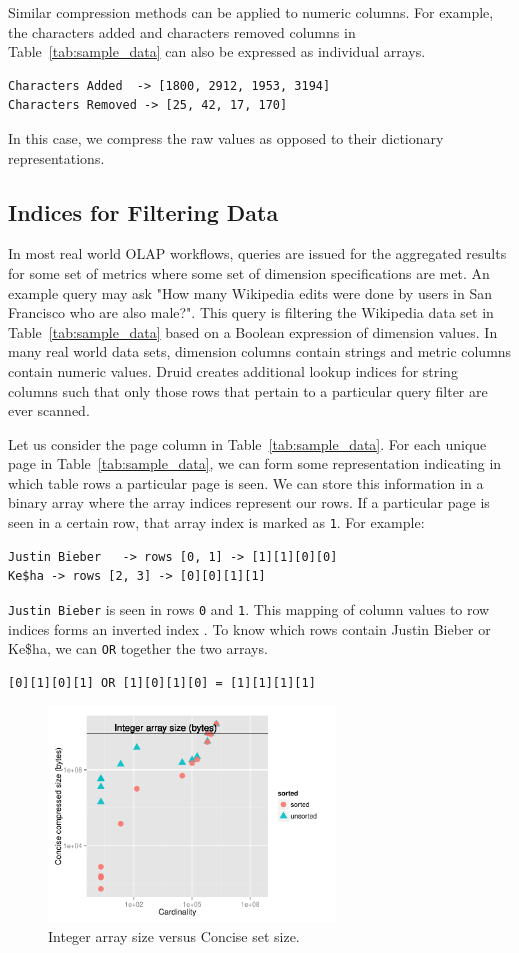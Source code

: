 \documentclass{acm_proc_article-sp}
\begin{document}
Similar compression methods can be applied to numeric
columns. For example, the characters added and characters removed columns in
Table~\ref{tab:sample_data} can also be expressed as individual
arrays.
\begin{verbatim}
Characters Added  -> [1800, 2912, 1953, 3194]
Characters Removed -> [25, 42, 17, 170]
\end{verbatim}
In this case, we compress the raw values as opposed to their dictionary
representations.

\subsection{Indices for Filtering Data}
In most real world OLAP workflows, queries are issued for the aggregated
results for some set of metrics where some set of dimension specifications are
met. An example query may ask "How many Wikipedia edits were done by users in
San Francisco who are also male?". This query is filtering the Wikipedia data
set in Table~\ref{tab:sample_data} based on a Boolean expression of dimension
values. In many real world data sets, dimension columns contain strings and
metric columns contain numeric values. Druid creates additional lookup
indices for string columns such that only those rows that pertain to a
particular query filter are ever scanned.

Let us consider the page column in
Table~\ref{tab:sample_data}. For each unique page in
Table~\ref{tab:sample_data}, we can form some representation
indicating in which table rows a particular page is seen. We can
store this information in a binary array where the array indices
represent our rows. If a particular page is seen in a certain
row, that array index is marked as \texttt{1}. For example:
\begin{verbatim}
Justin Bieber   -> rows [0, 1] -> [1][1][0][0]
Ke$ha -> rows [2, 3] -> [0][0][1][1]
\end{verbatim}

\texttt{Justin Bieber} is seen in rows \texttt{0} and \texttt{1}. This mapping of column values
to row indices forms an inverted index \cite{tomasic1993performance}. To know which
rows contain {\ttfamily Justin Bieber} or {\ttfamily Ke\$ha}, we can \texttt{OR} together
the two arrays.
\begin{verbatim}
[0][1][0][1] OR [1][0][1][0] = [1][1][1][1]
\end{verbatim}

\begin{figure}
\centering
\includegraphics[width = 3in]{concise_plot}
\caption{Integer array size versus Concise set size.}
\label{fig:concise_plot}
\end{figure}
\end{document}
